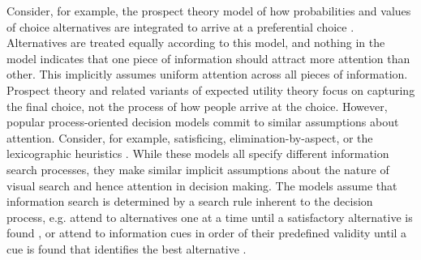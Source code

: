  Consider, for example, the prospect theory model of how probabilities and values of choice alternatives are integrated to arrive at a preferential choice \citep{tversky1979}. Alternatives are treated equally according to this model, and nothing in the model indicates that one piece of information should attract more attention than other. This implicitly assumes uniform attention across all pieces of information. Prospect theory and related variants of expected utility theory focus on capturing the final choice, not the process of how people arrive at the choice. However, popular process-oriented decision models commit to similar assumptions about attention. Consider, for example, satisficing, elimination-by-aspect, or the lexicographic heuristics \citep{payne1988, simon1956a}. While these models all specify different information search processes, they make similar implicit assumptions about the nature of visual search and hence attention in decision making. The models assume that information search is determined by a search rule inherent to the decision process, e.g. attend to alternatives one at a time until a satisfactory alternative is found \citep{stuttgen2012}, or attend to information cues in order of their predefined validity until a cue is found that identifies the best alternative \citep{krefeld-schwalb2019a}. \\ 

